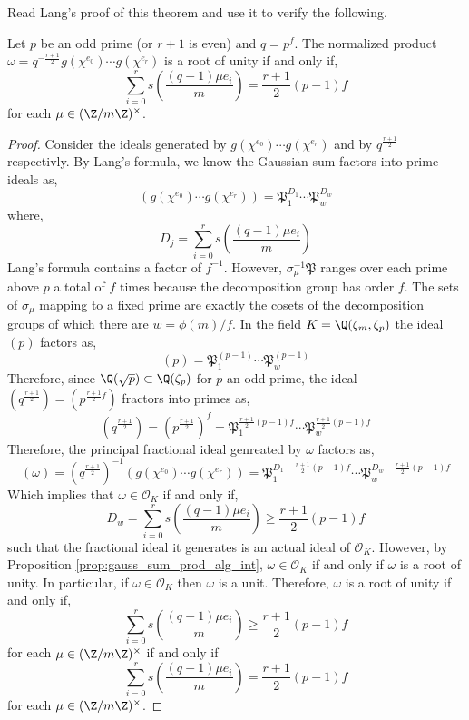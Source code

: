 \documentclass[12pt]{article}
\begin{document}
Read Lang's proof of this theorem and use it to verify the following.

\newcommand{\iO}{\mathcal{O}}
\newcommand{\s}[1]{s\left( #1 \right)}
\newcommand{\Pf}{\mathfrak{P}}

\begin{theorem} \label{thm:gauss_sum_is_root_of_unity_ideal_factorization_counting_condition}
Let $p$ be an odd prime (or $r + 1$ is even) and $q = p^f$. The normalized product $\omega = q^{-\frac{r+1}{2}} g(\chi^{e_0}) \cdots g(\chi^{e_r})$ is a root of unity if and only if,
\[ \sum_{i = 0}^r s\left(\frac{(q-1) \mu e_i}{m}\right) = \frac{r+1}{2} (p - 1) f \]
for each $\mu \in (\Z / m \Z)^\times$.
\end{theorem}

\begin{proof}
Consider the ideals generated by $g(\chi^{e_0}) \cdots g(\chi^{e_r})$ and by $q^{\frac{r+1}{2}}$ respectivly. By Lang's formula, we know the Gaussian sum factors into prime ideals as,
\[ (g(\chi^{e_0}) \cdots g(\chi^{e_r})) = \mathfrak{P}_1^{D_1} \cdots \mathfrak{P}_{w}^{D_{w}} \]
where,
\[ D_j = \sum_{i = 0}^r s\left(\frac{(q-1) \mu e_i}{m}\right) \]
Lang's formula contains a factor of $f^{-1}$. However, $\sigma_\mu^{-1} \mathfrak{P}$ ranges over each prime above $p$ a total of $f$ times because the decomposition group has order $f$. The sets of $\sigma_\mu$ mapping to a fixed prime are exactly the cosets of the decomposition groups of which there are $w = \phi(m)/f$. In the field $K = \Q(\zeta_m, \zeta_p)$ the ideal $(p)$ factors as,
\[ (p) = \mathfrak{P}_1^{(p-1)} \cdots \mathfrak{P}_w^{(p-1)} \] Therefore, since $\Q(\sqrt{p}) \subset \Q(\zeta_p)$ for $p$ an odd prime, the ideal $(q^{\frac{r+1}{2}}) = (p^{\frac{r+1}{2} f})$ fractors into primes as,
\[ (q^\frac{r+1}{2}) = (p^\frac{r+1}{2})^f = \mathfrak{P}_1^{\frac{r+1}{2} (p-1) f} \cdots \mathfrak{P}_w^{\frac{r+1}{2} (p-1) f} \]
Therefore, the principal fractional ideal genreated by $\omega$ factors as,
\[ (\omega) = (q^{\frac{r+1}{2}})^{-1} (g(\chi^{e_0}) \cdots g(\chi^{e_r})) = \mathfrak{P}_1^{D_1 - \frac{r+1}{2} (p-1) f} \cdots \mathfrak{P}_{w}^{D_{w} - \frac{r+1}{2} (p-1) f } \] 
Which implies that $\omega \in \iO_K$ if and only if,
\[ D_w =\sum_{i = 0}^r s\left(\frac{(q-1) \mu e_i}{m}\right) \ge \frac{r+1}{2} (p - 1) f \]
such that the fractional ideal it generates is an actual ideal of $\iO_{K}$. However, by Proposition \ref{prop:gauss_sum_prod_alg_int}, $\omega \in \iO_K$ if and only if $\omega$ is a root of unity. In particular, if $\omega \in \iO_K$ then $\omega$ is a unit. Therefore, $\omega$ is a root of unity if and only if,
\[ \sum_{i = 0}^r s\left(\frac{(q-1) \mu e_i}{m}\right) \ge \frac{r+1}{2} (p - 1) f \]
for each $\mu \in (\Z / m \Z)^\times$
if and only if
\[ \sum_{i = 0}^r s\left(\frac{(q-1) \mu e_i}{m}\right) = \frac{r+1}{2} (p - 1) f \]
for each $\mu \in (\Z / m \Z)^\times$. 
\end{proof}
\end{document}

